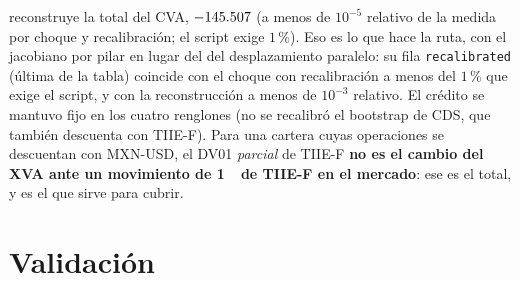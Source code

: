 \begin{sloppypar}
reconstruye la total del CVA, $\verif{cap16-total-reconstruida-cva}{-145.507}$ (a menos de $10^{-5}$ relativo de la medida por choque y recalibración; el script exige $1\,\%$). Eso es
lo que hace la ruta, con el jacobiano por pilar en lugar del del desplazamiento paralelo: su fila \texttt{recalibrated}
(última de la tabla) coincide con el choque con recalibración a menos del $1\,\%$ que exige el script, y con la
reconstrucción a menos de $10^{-3}$ relativo. El crédito se mantuvo fijo en los
cuatro renglones (no se recalibró el bootstrap de CDS, que también descuenta con TIIE-F). Para una cartera cuyas
operaciones se descuentan con MXN-USD, el DV01 \emph{parcial} de TIIE-F \textbf{no es el cambio del XVA ante un movimiento
de 1~\pb\ de TIIE-F en el mercado}: ese es el total, y es el que sirve para cubrir.
\end{sloppypar}

\section{Validación}\label{sec:cap16-validacion}

